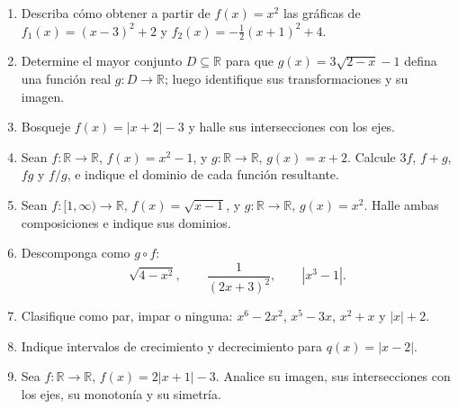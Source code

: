 \documentclass[10pt,a5paper]{article}
\begin{document}
\begin{ejercicios}
\begin{enumerate}
  \item Describa cómo obtener a partir de $f(x)=x^2$ las gráficas de $f_1(x)=(x-3)^2+2$ y $f_2(x)=-\tfrac12(x+1)^2+4$.
  \item Determine el mayor conjunto $D\subseteq\mathbb{R}$ para que $g(x)=3\sqrt{2-x}-1$ defina una función real $g:D\to\mathbb{R}$; luego identifique sus transformaciones y su imagen.
  \item Bosqueje $f(x)=|x+2|-3$ y halle sus intersecciones con los ejes.
  \item Sean $f:\mathbb{R}\to\mathbb{R}$, $f(x)=x^2-1$, y $g:\mathbb{R}\to\mathbb{R}$, $g(x)=x+2$. Calcule $3f$, $f+g$, $fg$ y $f/g$, e indique el dominio de cada función resultante.
  \item Sean $f:[1,\infty)\to\mathbb{R}$, $f(x)=\sqrt{x-1}$, y $g:\mathbb{R}\to\mathbb{R}$, $g(x)=x^2$. Halle ambas composiciones e indique sus dominios.
  \item Descomponga como $g\circ f$:
  \[
  \sqrt{4-x^2},\qquad \frac{1}{(2x+3)^2},\qquad |x^3-1|.
  \]
  \item Clasifique como par, impar o ninguna: $x^6-2x^2$, $x^5-3x$, $x^2+x$ y $|x|+2$.
  \item Indique intervalos de crecimiento y decrecimiento para $q(x)=|x-2|$.
  \item Sea $f:\mathbb{R}\to\mathbb{R}$, $f(x)=2|x+1|-3$. Analice su imagen, sus intersecciones con los ejes, su monotonía y su simetría.
\end{enumerate}
\end{ejercicios}
\end{document}
